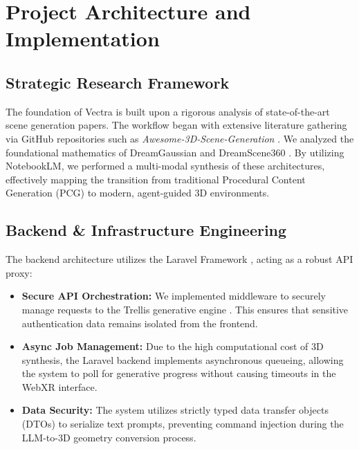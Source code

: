 \documentclass[11pt, a4paper]{article}
\begin{document}
\vspace{15pt}
\tableofcontents
\newpage

\section{Project Architecture and Implementation}

\subsection{Strategic Research Framework}
The foundation of Vectra is built upon a rigorous analysis of state-of-the-art scene generation papers. The workflow began with extensive literature gathering via GitHub repositories such as \textit{Awesome-3D-Scene-Generation} \cite{awesome3d}. We analyzed the foundational mathematics of DreamGaussian \cite{tang2024dreamgaussian} and DreamScene360 \cite{dreamscene}. By utilizing NotebookLM, we performed a multi-modal synthesis of these architectures, effectively mapping the transition from traditional Procedural Content Generation (PCG) to modern, agent-guided 3D environments.

\subsection{Backend \& Infrastructure Engineering}
The backend architecture utilizes the Laravel Framework \cite{laravel}, acting as a robust API proxy:
\begin{itemize}
    \item \textbf{Secure API Orchestration:} We implemented middleware to securely manage requests to the Trellis generative engine \cite{trellis}. This ensures that sensitive authentication data remains isolated from the frontend.
    \item \textbf{Async Job Management:} Due to the high computational cost of 3D synthesis, the Laravel backend implements asynchronous queueing, allowing the system to poll for generative progress without causing timeouts in the WebXR interface.
    \item \textbf{Data Security:} The system utilizes strictly typed data transfer objects (DTOs) to serialize text prompts, preventing command injection during the LLM-to-3D geometry conversion process.
\end{itemize}
\end{document}
